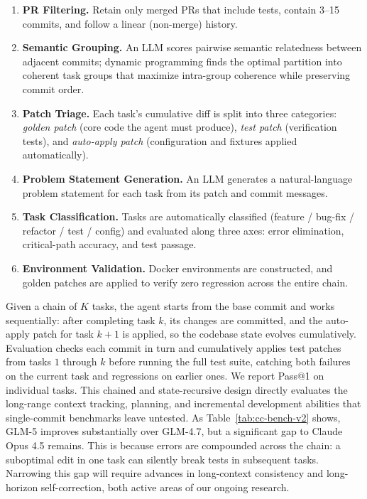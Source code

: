 \begin{enumerate}[leftmargin=1.5em,itemsep=2pt]
    \item \textbf{PR Filtering.} Retain only merged PRs that include tests, contain 3--15 commits, and follow a linear (non-merge) history.
    \item \textbf{Semantic Grouping.} An LLM scores pairwise semantic relatedness between adjacent commits; dynamic programming finds the optimal partition into coherent task groups that maximize intra-group coherence while preserving commit order.
    \item \textbf{Patch Triage.} Each task's cumulative diff is split into three categories: \emph{golden patch} (core code the agent must produce), \emph{test patch} (verification tests), and \emph{auto-apply patch} (configuration and fixtures applied automatically).
    \item \textbf{Problem Statement Generation.} An LLM generates a natural-language problem statement for each task from its patch and commit messages.
    \item \textbf{Task Classification.} Tasks are automatically classified (feature / bug-fix / refactor / test / config) and evaluated along three axes: error elimination, critical-path accuracy, and test passage.
    \item \textbf{Environment Validation.} Docker environments are constructed, and golden patches are applied to verify zero regression across the entire chain.
\end{enumerate}

Given a chain of $K$ tasks, the agent starts from the base commit and works sequentially: after completing task $k$, its changes are committed, and the auto-apply patch for task $k{+}1$ is applied, so the codebase state evolves cumulatively. Evaluation checks each commit in turn and cumulatively applies test patches from tasks $1$ through $k$ before running the full test suite, catching both failures on the current task and regressions on earlier ones. We report Pass@1 on individual tasks. This chained and state-recursive design directly evaluates the long-range context tracking, planning, and incremental development abilities that single-commit benchmarks leave untested. As Table~\ref{tab:cc-bench-v2} shows, GLM-5 improves substantially over GLM-4.7, but a significant gap to Claude Opus 4.5 remains. This is because errors are compounded across the chain: a suboptimal edit in one task can silently break tests in subsequent tasks. Narrowing this gap will require advances in long-context consistency and long-horizon self-correction, both active areas of our ongoing research.


